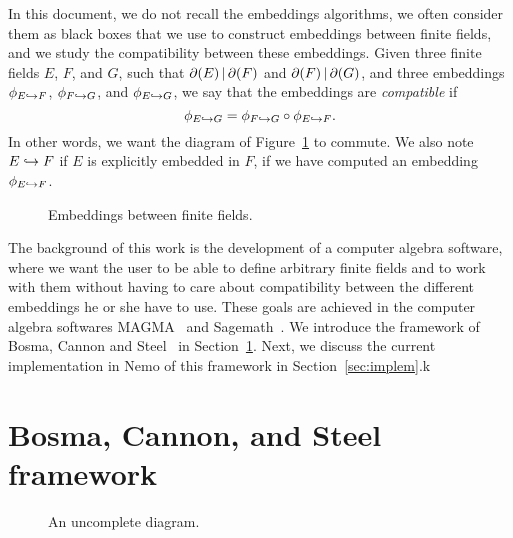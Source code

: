 \documentclass[11pt]{article}
\begin{document}
In this document, we do not recall the embeddings algorithms, we often
consider them as black boxes that we use to construct embeddings between
finite fields, and we study the compatibility between these embeddings. Given
three finite fields $E$, $F$, and $G$, such that $\partial(E)\,|\,\partial(F)$ and $\partial(F)\,|\,\partial(G)$, and three embeddings
$\phi_{E\hookrightarrow F}$, $\phi_{F\hookrightarrow G}$, and $\phi_{E\hookrightarrow G}$, we say that the
embeddings are \emph{compatible} if 
\[
  \phi_{E\hookrightarrow G}=\phi_{F\hookrightarrow G}\circ\phi_{E\hookrightarrow F}.
\]
In other words, we want the diagram of Figure~\ref{fig:compatibility} to
commute. We also note $E\hookrightarrow F$ if $E$ is explicitly embedded in $F$, \ie if
we have computed an embedding $\phi_{E\hookrightarrow F}$.
\begin{figure}
  \centering

  \caption{Embeddings between finite fields.}
  \label{fig:compatibility}
\end{figure}
The background of this work is the development of a computer algebra
software, where we want the user to be able to define arbitrary finite
fields and to work with them without having to care about compatibility
between the different embeddings he or she have to use. These goals are
achieved in the computer algebra softwares MAGMA~\cite{Magma} and
Sagemath~\cite{Sagemath}. We introduce the
framework of Bosma, Cannon and Steel~\cite{BCS97} in
Section~\ref{sec:bcs-framework}. Next, we discuss the current implementation in
Nemo of
this framework in Section~\ref{sec:implem}.k

\section{Bosma, Cannon, and Steel framework}
\label{sec:bcs-framework}
\begin{figure}
  \centering

  \caption{An uncomplete diagram.}
  \label{fig:uncomplete}
\end{figure}
\end{document}
